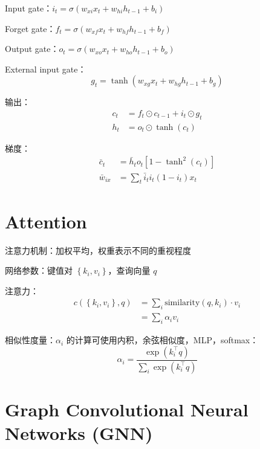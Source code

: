 \documentclass[openany]{ctexbook}
\theoremstyle{kaiti}
\theoremstyle{normal}
\begin{document}
Input gate：$i_t=\sigma \left(w_{xi}x_t+w_{hi}h_{t-1}+b_i \right)$

Forget gate：$f_t=\sigma \left(w_{xf}x_t+w_{hf}h_{t-1}+b_f \right)$

Output gate：$o_t=\sigma \left(w_{xo}x_t+w_{ho}h_{t-1}+b_o \right)$

External input gate：
\begin{equation}
g_t=\tanh \left(w_{xg}x_t+w_{hg}h_{t-1}+b_g \right)
\end{equation}

输出：
\begin{equation}
\begin{aligned}
  c_t&=f_t\odot c_{t-1}+i_t\odot g_t\\
  h_t&=o_t\odot \tanh \left(c_t \right)
\end{aligned}
\end{equation}

梯度：
\begin{equation}
\begin{aligned}
  \bar{c}_t&=\bar{h}_to_t\left[1-\tanh^2\left(c_t \right)\right] \\
  \bar{w}_{ix}&=\sum_t\bar{i}_ti_t\left(1-i_t \right)x_t
\end{aligned}
\end{equation}

\section{Attention}

注意力机制：加权平均，权重表示不同的重视程度

网络参数：键值对 $\left\{ k_i,v_i \right\}$，查询向量 $q$

注意力：
\begin{equation}
\begin{aligned}
  c\left(\left\{ k_i,v_i \right\} ,q \right)&=\sum_i\mathrm{similarity}\left(q,k_i \right)\cdot v_i\\
  &=\sum_i\alpha_iv_i
\end{aligned}
\end{equation}

相似性度量：$\alpha_i$ 的计算可使用内积，余弦相似度，MLP，softmax：
\begin{equation}
\alpha_i=\frac{\exp \left(k_{i}^{\top}q \right)}{\sum_i\exp \left(k_{i}^{\top}q \right)}
\end{equation}

\section{Graph Convolutional Neural Networks (GNN)}
\end{document}
